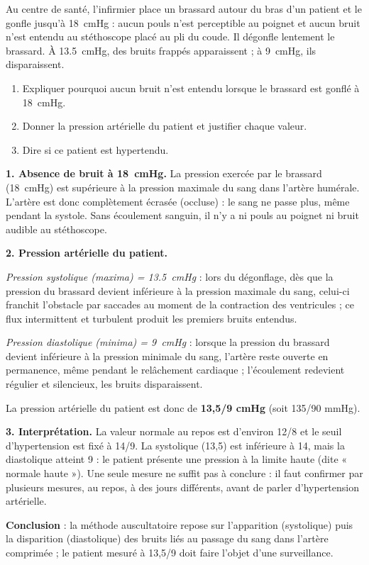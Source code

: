 \documentclass[11pt]{article}
\begin{document}
\begin{exoresolu}
Au centre de santé, l'infirmier place un brassard autour du bras d'un patient et le gonfle jusqu'à \SI{18}{cmHg} : aucun pouls n'est perceptible au poignet et aucun bruit n'est entendu au stéthoscope placé au pli du coude. Il dégonfle lentement le brassard. À \SI{13,5}{cmHg}, des bruits frappés apparaissent ; à \SI{9}{cmHg}, ils disparaissent.

\begin{enumerate}
\item Expliquer pourquoi aucun bruit n'est entendu lorsque le brassard est gonflé à \SI{18}{cmHg}.
\item Donner la pression artérielle du patient et justifier chaque valeur.
\item Dire si ce patient est hypertendu.
\end{enumerate}

\tcblower

\textbf{1. Absence de bruit à \SI{18}{cmHg}.} La pression exercée par le brassard (\SI{18}{cmHg}) est supérieure à la pression maximale du sang dans l'artère humérale. L'artère est donc complètement écrasée (occluse) : le sang ne passe plus, même pendant la systole. Sans écoulement sanguin, il n'y a ni pouls au poignet ni bruit audible au stéthoscope.

\textbf{2. Pression artérielle du patient.}

\emph{Pression systolique (maxima) = \SI{13,5}{cmHg}} : lors du dégonflage, dès que la pression du brassard devient inférieure à la pression maximale du sang, celui-ci franchit l'obstacle par saccades au moment de la contraction des ventricules ; ce flux intermittent et turbulent produit les premiers bruits entendus.

\emph{Pression diastolique (minima) = \SI{9}{cmHg}} : lorsque la pression du brassard devient inférieure à la pression minimale du sang, l'artère reste ouverte en permanence, même pendant le relâchement cardiaque ; l'écoulement redevient régulier et silencieux, les bruits disparaissent.

La pression artérielle du patient est donc de \textbf{13,5/9 cmHg} (soit 135/90 mmHg).

\textbf{3. Interprétation.} La valeur normale au repos est d'environ 12/8 et le seuil d'hypertension est fixé à 14/9. La systolique (13,5) est inférieure à 14, mais la diastolique atteint 9 : le patient présente une pression à la limite haute (dite « normale haute »). Une seule mesure ne suffit pas à conclure : il faut confirmer par plusieurs mesures, au repos, à des jours différents, avant de parler d'hypertension artérielle.

\textbf{Conclusion} : la méthode auscultatoire repose sur l'apparition (systolique) puis la disparition (diastolique) des bruits liés au passage du sang dans l'artère comprimée ; le patient mesuré à 13,5/9 doit faire l'objet d'une surveillance.
\end{exoresolu}
\end{document}
